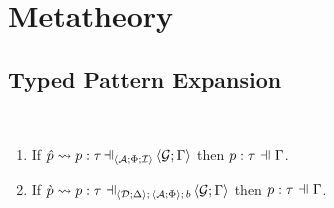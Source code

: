 \section{Metatheory}
\subsection{Typed Pattern Expansion}\label{appendix:SES-typed-pattern-expansion}
\begin{theorem}\label{thm:typed-pattern-expansion-B} ~
\begin{enumerate}
  \item If $\pExpandsSP{\uDD{\uD}{\Delta}}{\uASI{\uA}{\Phi}{\uI}}{\upv}{p}{\tau}{\uGG{\uG}{\pctx}}$ then $\patType{\pctx}{p}{\tau}$.
  \item If $\cvalidP{\uGG{\uG}{\pctx}}{\pscene{\uDD{\uD}{\Delta}}{\uAP{\uA}{\Phi}}{b}}{\cpv}{p}{\tau}$ then $\patType{\pctx}{p}{\tau}$.
\end{enumerate}
\end{theorem}
